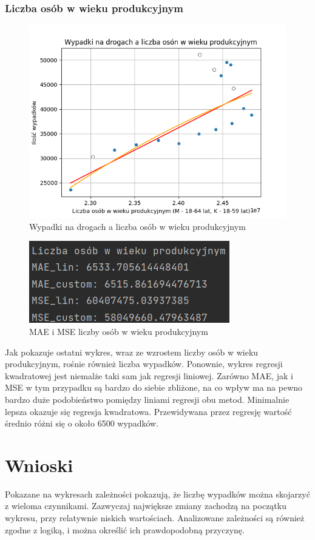 \documentclass[10pt]{article}
\begin{document}
\subsubsection{Liczba osób w wieku produkcyjnym}
\begin{figure}[h]
\begin{center}
\includegraphics[width=0.5\linewidth]{images/plots/ludzie.png}
\caption{Wypadki na drogach a liczba osób w wieku produkcyjnym}
\end{center}
\end{figure}
\begin{figure}[h]
\begin{center}
\includegraphics[width=0.5\linewidth]{images/errors/ludzie_errors.png}
\caption{MAE i MSE liczby osób w wieku produkcyjnym}
\end{center}
\end{figure}
Jak pokazuje ostatni wykres, wraz ze wzrostem liczby osób w wieku produkcyjnym, rośnie również liczba wypadków. Ponownie, wykres regresji kwadratowej jest niemalże taki sam jak regresji liniowej. Zarówno MAE, jak i MSE w tym przypadku są bardzo do siebie zbliżone, na co wpływ ma na pewno bardzo duże podobieństwo pomiędzy liniami regresji obu metod. Minimalnie lepsza okazuje się regresja kwadratowa. Przewidywana przez regresję wartość średnio różni się o około 6500 wypadków.
\pagebreak

\section{Wnioski}
Pokazane na wykresach zależności pokazują, że liczbę wypadków można skojarzyć z wieloma czynnikami. Zazwyczaj największe zmiany zachodzą na początku wykresu, przy relatywnie niskich wartościach. Analizowane zależności są również zgodne z logiką, i można określić ich prawdopodobną przyczynę.
\end{document}
